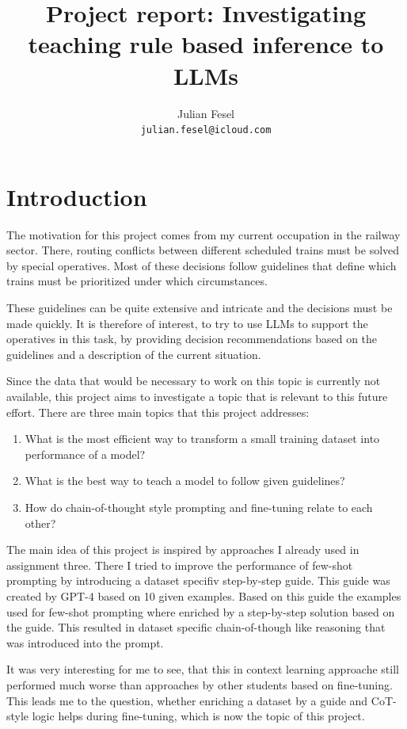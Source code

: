 \documentclass[11pt]{article}
\title{Project report: Investigating teaching rule based inference to LLMs}
\author{Julian Fesel \\
\texttt{julian.fesel@icloud.com}
}
\begin{document}
    \maketitle


    \section{Introduction}
    The motivation for this project comes from my current occupation in the railway sector.
    There, routing conflicts between different scheduled trains must be solved by special operatives.
    Most of these decisions follow guidelines that define which trains must be prioritized under which circumstances.

    These guidelines can be quite extensive and intricate and the decisions must be made quickly.
    It is therefore of interest, to try to use LLMs to support the operatives in this task, by providing decision
    recommendations based on the guidelines and a description of the current situation.

    Since the data that would be necessary to work on this topic is currently not available, this project aims to
    investigate a topic that is relevant to this future effort.
    There are three main topics that this project addresses:
    \begin{enumerate}
        \item What is the most efficient way to transform a small training dataset into performance of a model?
        \item What is the best way to teach a model to follow given guidelines?
        \item How do chain-of-thought style prompting and fine-tuning relate to each other?
    \end{enumerate}

    The main idea of this project is inspired by approaches I already used in assignment three.
    There I tried to improve the performance of few-shot prompting by introducing a dataset specifiv step-by-step guide.
    This guide was created by GPT-4 based on 10 given examples.
    Based on this guide the examples used for few-shot prompting where enriched by a step-by-step solution based on the guide.
    This resulted in dataset specific chain-of-though like reasoning that was introduced into the prompt.

    It was very interesting for me to see, that this in context learning approache still performed much worse than
    approaches by other students based on fine-tuning.
    This leads me to the question, whether enriching a dataset by a guide and CoT-style logic helps during fine-tuning,
    which is now the topic of this project.
\end{document}
